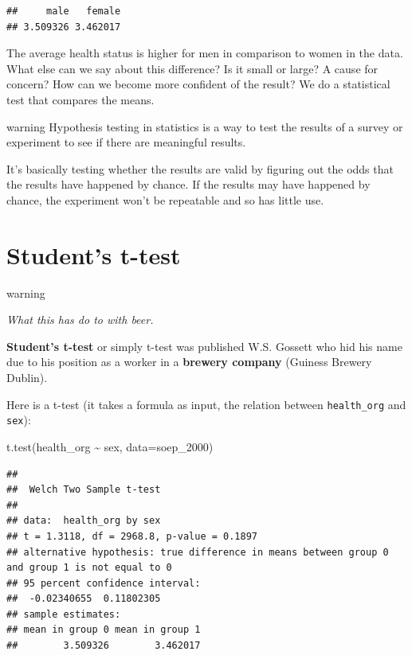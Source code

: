 \documentclass[
]{book}
\newenvironment{Shaded}{\begin{snugshade}}{\end{snugshade}}
\newcommand{\AttributeTok}[1]{\textcolor[rgb]{0.77,0.63,0.00}{#1}}
\newcommand{\FunctionTok}[1]{\textcolor[rgb]{0.00,0.00,0.00}{#1}}
\newcommand{\NormalTok}[1]{#1}
\newcommand{\SpecialCharTok}[1]{\textcolor[rgb]{0.00,0.00,0.00}{#1}}
\begin{document}
\begin{verbatim}
##     male   female 
## 3.509326 3.462017
\end{verbatim}

The average health status is higher for men in comparison to women in the data. What else can we say about this difference? Is it small or large? A cause for concern? How can we become more confident of the result? We do a statistical test that compares the means.

\begin{infobox2}warning
Hypothesis testing in statistics is a way to test the results of a survey or experiment to see if there are meaningful results.

\end{infobox2}

It's basically testing whether the results are valid by figuring out the odds that the results have happened by chance. If the results may have happened by chance, the experiment won't be repeatable and so has little use.

\hypertarget{students-t-test}{%
\section{Student's t-test}\label{students-t-test}}

\begin{infobox2}warning

\emph{What this has do to with beer.}

\textbf{Student's t-test} or simply t-test was published W.S. Gossett who hid his name due to his position as a worker in a \textbf{brewery company} (Guiness Brewery Dublin).

\end{infobox2}

Here is a t-test (it takes a formula as input, the relation between \texttt{health\_org} and \texttt{sex}):

\begin{Shaded}
\begin{Highlighting}[]
\FunctionTok{t.test}\NormalTok{(health\_org }\SpecialCharTok{\textasciitilde{}}\NormalTok{ sex, }\AttributeTok{data=}\NormalTok{soep\_2000)}
\end{Highlighting}
\end{Shaded}

\begin{verbatim}
## 
##  Welch Two Sample t-test
## 
## data:  health_org by sex
## t = 1.3118, df = 2968.8, p-value = 0.1897
## alternative hypothesis: true difference in means between group 0 and group 1 is not equal to 0
## 95 percent confidence interval:
##  -0.02340655  0.11802305
## sample estimates:
## mean in group 0 mean in group 1 
##        3.509326        3.462017
\end{verbatim}
\end{document}
